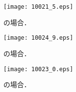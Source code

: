 \documentclass[../master]{subfiles}
\begin{document}
\begin{figure}
  \centering
  \texttt{[image: 10021\_5.eps]}
  \caption{\MethaneHerium の場合．}
  \label{fig::three_alpha_ch4_he}
\end{figure}

\begin{figure}
  \centering
  \texttt{[image: 10024\_9.eps]}
  \caption{\isoButaneHydro の場合．}
  \label{fig::three_alpha_ic4h10_h2}
\end{figure}

\begin{figure}
  \centering
  \texttt{[image: 10023\_0.eps]}
  \caption{\isoButaneHerium の場合．}
  \label{fig::three_alpha_ic4h10_he}
\end{figure}
\end{document}
